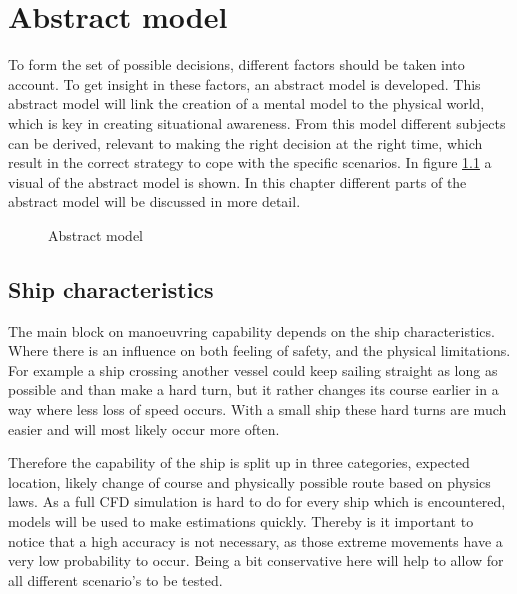 \chapter{Abstract model}
To form the set of possible decisions, different factors should be taken into account. To get insight in these factors, an abstract model is developed. This abstract model will link the creation of a mental model to the physical world, which is key in creating situational awareness. From this model different subjects can be derived, relevant to making the right decision at the right time, which result in the correct strategy to cope with the specific scenarios.
In figure \ref{fig:abstract-model} a visual of the abstract model is shown. In this chapter different parts of the abstract model will be discussed in more detail.

\begin{figure}[hb]
	\centering
	\caption{Abstract model}
	\label{fig:abstract-model}
\end{figure}

\section{Ship characteristics}
The main block on manoeuvring capability depends on the ship characteristics. Where there is an influence on both feeling of safety, and the physical limitations. For example a ship crossing another vessel could keep sailing straight as long as possible and than make a hard turn, but it rather changes its course earlier in a way where less loss of speed occurs. With a small ship these hard turns are much easier and will most likely occur more often.

Therefore the capability of the ship is split up in three categories, expected location, likely change of course and physically possible route based on physics laws.
As a full CFD simulation is hard to do for every ship which is encountered, models will be used to make estimations quickly. Thereby is it important to notice that a high accuracy is not necessary, as those extreme movements have a very low probability to occur. Being a bit conservative here will help to allow for all different scenario's to be tested.

